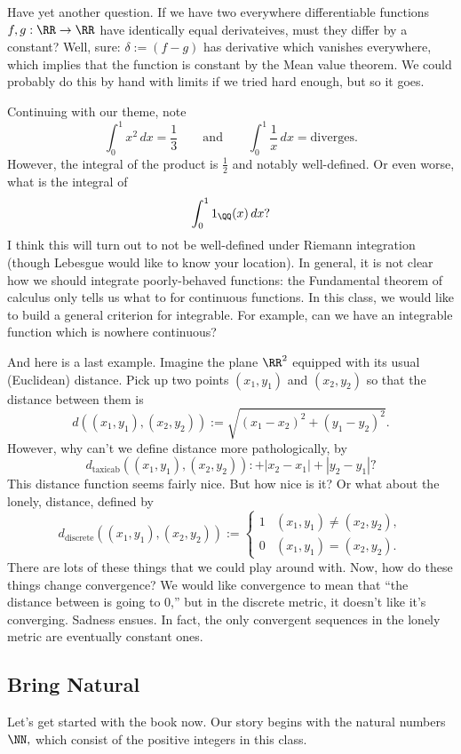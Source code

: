 Have yet another question. If we have two everywhere differentiable functions $f,g:\RR\to\RR$ have identically equal derivateives, must they differ by a constant? Well, sure: $\delta:=(f-g)$ has derivative which vanishes everywhere, which implies that the function is constant by the Mean value theorem. We could probably do this by hand with limits if we tried hard enough, but so it goes.

Continuing with our theme, note
\[\int_0^1x^2\,dx=\frac13\qquad\text{and}\qquad\int_0^1\frac1x\,dx=\text{diverges}.\]
However, the integral of the product is $\frac12$ and notably well-defined. Or even worse, what is the integral of
\[\int_0^11_{\QQ}(x)\,dx?\]
I think this will turn out to not be well-defined under Riemann integration (though Lebesgue would like to know your location). In general, it is not clear how we should integrate poorly-behaved functions: the Fundamental theorem of calculus only tells us what to for continuous functions. In this class, we would like to build a general criterion for integrable. For example, can we have an integrable function which is nowhere continuous?

And here is a last example. Imagine the plane $\RR^2$ equipped with its usual (Euclidean) distance. Pick up two points $(x_1,y_1)$ and $(x_2,y_2)$ so that the distance between them is
\[d((x_1,y_1),(x_2,y_2)):=\sqrt{(x_1-x_2)^2+(y_1-y_2)^2}.\]
However, why can't we define distance more pathologically, by
\[d_{\text{taxicab}}((x_1,y_1),(x_2,y_2)):+|x_2-x_1|+|y_2-y_1|?\]
This distance function seems fairly nice. But how nice is it? Or what about the lonely, distance, defined by
\[d_{\text{discrete}}((x_1,y_1),(x_2,y_2)):=\begin{cases}
	1 & (x_1,y_1)\ne(x_2,y_2), \\
	0 & (x_1,y_1)=(x_2,y_2).
\end{cases}\]
There are lots of these things that we could play around with. Now, how do these things change convergence? We would like convergence to mean that ``the distance between is going to $0$,'' but in the discrete metric, it doesn't like it's converging. Sadness ensues. In fact, the only convergent sequences in the lonely metric are eventually constant ones.

\subsection{Bring Natural}
Let's get started with the book now. Our story begins with the natural numbers $\NN,$ which consist of the positive integers in this class.

